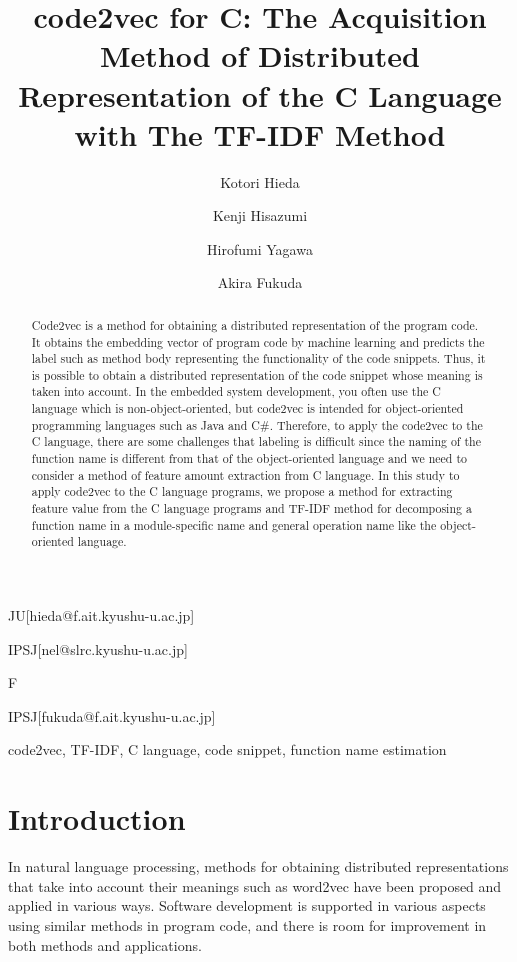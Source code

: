 \documentclass[JIP]{apris}
\begin{document}
\title{code2vec for C: The Acquisition Method of Distributed Representation of the C Language with The TF-IDF Method}


\author{Kotori Hieda}{JU}[hieda@f.ait.kyushu-u.ac.jp]
\author{Kenji Hisazumi}{IPSJ}[nel@slrc.kyushu-u.ac.jp]
\author{Hirofumi Yagawa}{F}
\author{Akira Fukuda}{IPSJ}[fukuda@f.ait.kyushu-u.ac.jp]


\begin{abstract}
Code2vec is a method for obtaining a distributed representation of the program code. It obtains the embedding vector of program code by machine learning and predicts the label such as method body representing the functionality of the code snippets. Thus, it is possible to obtain a distributed representation of the code snippet whose meaning is taken into account. In the embedded system development, you often use the C language which is non-object-oriented, but code2vec is intended for object-oriented programming languages ​​such as Java and C\#. Therefore, to apply the code2vec to the C language,  there are some challenges that labeling is difficult since the naming of the function name is different from that of the object-oriented language and we need to consider a method of feature amount extraction from C language. In this study to apply code2vec to the C language programs, we propose a method for extracting feature value from the C language programs and TF-IDF method for decomposing a function name in a module-specific name and general operation name like the object-oriented language.
\end{abstract}

\begin{keyword}
code2vec, TF-IDF, C language, code snippet, function name estimation
\end{keyword}

\maketitle

\section{Introduction}
In natural language processing, methods for obtaining distributed representations that take into account their meanings such as word2vec\cite{rong2014word2vec} have been proposed and applied in various ways.
Software development is supported in various aspects using similar methods in program code, and there is room for improvement in both methods and applications.
\end{document}

